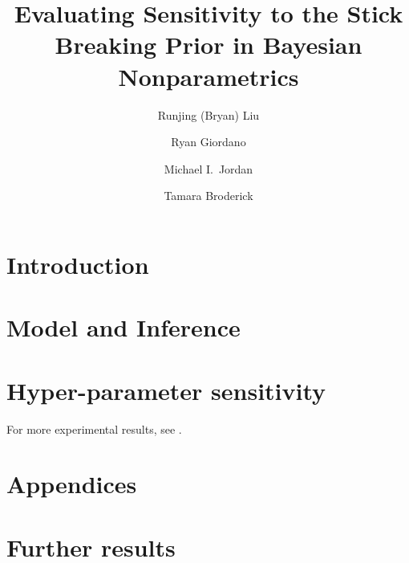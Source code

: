 \documentclass{article}
\title{Evaluating Sensitivity to the Stick Breaking Prior in Bayesian Nonparametrics}
\author[1*]{Runjing (Bryan) Liu}
\author[1*]{Ryan Giordano}
\author[1]{Michael I.~Jordan}
\author[2]{Tamara Broderick}
\affil[*]{These authors contributed equally}
\affil[1]{UC Berkeley}
\affil[2]{MIT}
\begin{document}
\maketitle

\section{Introduction}\label{sec:introduction}


\section{Model and Inference}\label{sec:model}




\section{Hyper-parameter sensitivity}\label{sec:hyper_param_sens}








For more experimental results, see .

% 



% 

\newpage



\newpage
\appendix
\section*{Appendices}


\section{Further results}\label{app:results}


\end{document}
